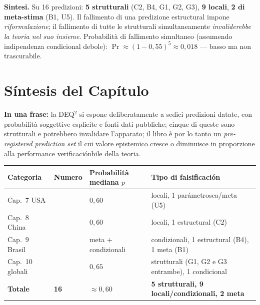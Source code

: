 \Proved{} \textbf{Sintesi.} Su 16 predizioni: \textbf{5 strutturali}
(C2, B4, G1, G2, G3), \textbf{9 locali}, \textbf{2 di meta-stima} (B1,
U5). Il fallimento di una predizione estructural impone
\emph{riformulazione}; il fallimento di tutte le strutturali
simultaneamente \emph{invaliderebbe la teoria nel suo insieme}.
Probabilità di fallimento simultaneo (assumendo indipendenza
condicional debole): \(\Pr \approx (1-0{,}55)^5 \approx 0{,}018\) ---
basso ma non trascurabile.



\section{Síntesis del Capítulo}\label{sintesi-del-capítulo}

\Proved{} \textbf{In una frase:} la DEQ$^2$ si espone deliberatamente a
sedici predizioni datate, con probabilità soggettive esplicite e fonti
dati pubbliche; cinque di queste sono strutturali e potrebbero
invalidare l'apparato; il libro è por lo tanto un \emph{pre-registered
prediction set} il cui valore epistemico cresce o diminuisce in
proporzione alla performance verificaciónbile della teoria.

{\def\LTcaptype{none} %
{\small\begin{longtable}[]{@{}
  >{\raggedright\arraybackslash}p{}
  >{\raggedright\arraybackslash}p{}
  >{\raggedright\arraybackslash}p{}
  >{\raggedright\arraybackslash}p{}@{}}
\toprule\noalign{}
\begin{minipage}[b]{\linewidth}\raggedright
Categoria
\end{minipage} & \begin{minipage}[b]{\linewidth}\raggedright
Numero
\end{minipage} & \begin{minipage}[b]{\linewidth}\raggedright
Probabilità mediana \(p\)
\end{minipage} & \begin{minipage}[b]{\linewidth}\raggedright
Tipo di falsificación
\end{minipage} \\
\midrule\noalign{}
\endhead
\bottomrule\noalign{}
\endlastfoot
Cap.~7 USA & 5 & \(0{,}60\) & 4 locali, 1 parámetrosca/meta (U5) \\
Cap.~8 China & 4 & \(0{,}60\) & 3 locali, 1 estructural (C2) \\
Cap.~9 Brasil & 4 & meta + condizionali & 2 condizionali, 1 estructural
(B4), 1 meta (B1) \\
Cap.~10 globali & 3 & \(0{,}65\) & 2 strutturali (G1, G2 e G3 entrambe),
1 condicional \\
\textbf{Totale} & \textbf{16} & \(\approx 0{,}60\) & \textbf{5
strutturali, 9 locali/condizionali, 2 meta} \\
\end{longtable}}
}

